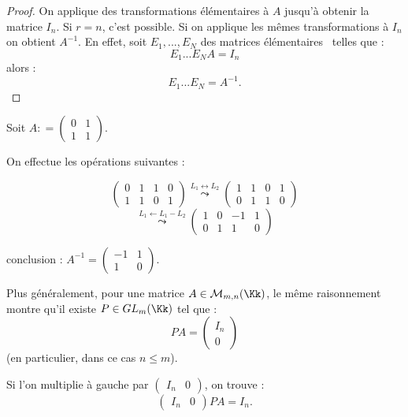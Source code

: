\documentclass[class=report,crop=false]{standalone}
\newcommand{\GL}{GL}
\begin{document}
\begin{proof}
On applique des transformations élémentaires à $A$ jusqu'à obtenir la matrice $I_n$. Si $r = n$, c'est possible. Si on applique les mêmes transformations à $I_n$ on obtient $A^{-1}$. En effet, soit $E_1,..., E_N$ des matrices \og élémentaires \fg\ telles que :
\[E_1...E_NA = I_n\]
alors : \[E_1...E_N = A^{-1} .\] 
\end{proof}
\begin{exemple}
Soit $A : = \left(\begin{array}{cc}
0 & 1 \\
1 & 1
\end{array}\right)$.

On effectue les opérations suivantes :

\[\left(\begin{array}{cc|cc}
0 & 1 &1 & 0\\
1 & 1 & 0 & 1
\end{array}
\right) \stackrel{L_1 \leftrightarrow L_2 }{\leadsto} \left(\begin{array}{cc|cc}
1& 1 &0 & 1\\
0 & 1 & 1 & 0
\end{array}
\right) \]
\[\stackrel{L_1 \leftarrow L_1 -L_2 }{\leadsto} \left(\begin{array}{cc|cc}
1& 0 &-1 & 1\\
0 & 1 & 1 & 0
\end{array}
\right)\]

conclusion : $A^{-1} = \left(\begin{array}{cc}
-1& 1\\
1& 0
\end{array}
\right)$.
\end{exemple}

Plus généralement, pour une matrice $A  \in \mathcal{M}_{m,n}(\Kk)$, le même raisonnement montre qu'il existe $P \in \GL_m(\Kk)$ tel que :
\[PA =\left( \begin{array}{c}
I_n\\ \hline
0
\end{array}\right) \]
(en particulier, dans ce cas $n \le m$).

Si l'on multiplie à gauche par $\left(\begin{array}{c|c}
I_n & 0
\end{array}\right)$, on trouve :
\[\left(\begin{array}{c|c}
I_n & 0
\end{array}\right) PA = I_n .\]
\end{document}
